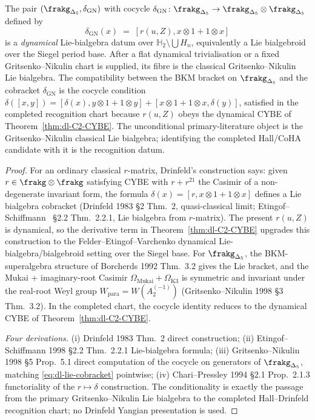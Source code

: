 \begin{theorem}
\label{thm:dl-C3-lie-bialgebra}
\ClaimStatusConditional
{}
The pair $(\frakg_{\Delta_5}, \delta_{\mathrm{GN}})$ with cocycle
$\delta_{\mathrm{GN}}\colon\frakg_{\Delta_5}\to\frakg_{\Delta_5}\otimes
\frakg_{\Delta_5}$ defined by
\begin{equation}
\label{eq:dl-lie-cobracket}
 \delta_{\mathrm{GN}}(x)
 \;=\;
 [r(u, Z), x\otimes 1 + 1\otimes x]
\end{equation}
is a \emph{dynamical} Lie-bialgebra datum over
$\mathbb H_2\setminus\bigcup H_n$, equivalently a Lie bialgebroid
over the Siegel period base. After a flat dynamical trivialisation
or a fixed Gritsenko--Nikulin chart is supplied, its fibre is the
classical Gritsenko--Nikulin Lie bialgebra. The
compatibility between the BKM bracket on $\frakg_{\Delta_5}$ and the
cobracket $\delta_{\mathrm{GN}}$ is the cocycle condition
$\delta([x, y]) = [\delta(x), y\otimes 1 + 1\otimes y]
+ [x\otimes 1 + 1\otimes x, \delta(y)]$, satisfied in the completed
recognition chart because $r(u, Z)$ obeys the dynamical CYBE of
Theorem~\ref{thm:dl-C2-CYBE}. The unconditional primary-literature
object is the Gritsenko--Nikulin classical Lie bialgebra; identifying
the completed Hall/CoHA candidate with it is the recognition datum.
\end{theorem}

\begin{proof}
For an ordinary classical $r$-matrix, Drinfeld's construction says:
given $r\in\frakg\otimes\frakg$ satisfying CYBE with $r + r^{21}$ the
Casimir of a non-degenerate invariant form, the formula
$\delta(x) = [r, x\otimes 1 + 1\otimes x]$ defines a Lie bialgebra
cobracket (Drinfeld 1983 \S2 Thm.~2, quasi-classical limit;
Etingof--Schiffmann~\cite{EtingofSchiffmann1998Lectures} \S2.2
Thm.~2.2.1, Lie bialgebra from $r$-matrix). The present $r(u,Z)$ is
dynamical, so the derivative term in
Theorem~\ref{thm:dl-C2-CYBE} upgrades this construction to the
Felder--Etingof--Varchenko dynamical Lie-bialgebra/bialgebroid
setting over the Siegel base. For $\frakg_{\Delta_5}$,
the BKM-superalgebra structure of Borcherds 1992 Thm.~3.2 gives the
Lie bracket, and the Mukai + imaginary-root Casimir
$\Omega_{\mathrm{Mukai}} + \Omega_{\mathrm{K3}}$ is symmetric and
invariant under the real-root Weyl group
$W_{\mathrm{para}} = W(A_2^{(-1)})$ (Gritsenko--Nikulin 1998 \S3
Thm.~3.2). In the completed chart, the cocycle identity reduces to
the dynamical CYBE of Theorem~\ref{thm:dl-C2-CYBE}.

\emph{Four derivations.}
(i) Drinfeld 1983 Thm.~2 direct construction;
(ii) Etingof--Schiffmann 1998 \S2.2 Thm.~2.2.1 Lie-bialgebra formula;
(iii) Gritsenko--Nikulin 1998 \S5 Prop.~5.1 direct computation of the
 cocycle on generators of $\frakg_{\Delta_5}$, matching
 \eqref{eq:dl-lie-cobracket} pointwise;
(iv) Chari--Pressley 1994 \S2.1 Prop.~2.1.3 functoriality of the
 $r\mapsto\delta$ construction.
The conditionality is exactly the passage from the primary
Gritsenko--Nikulin Lie bialgebra to the completed Hall--Drinfeld
recognition chart; no Drinfeld Yangian presentation is used.
\end{proof}

